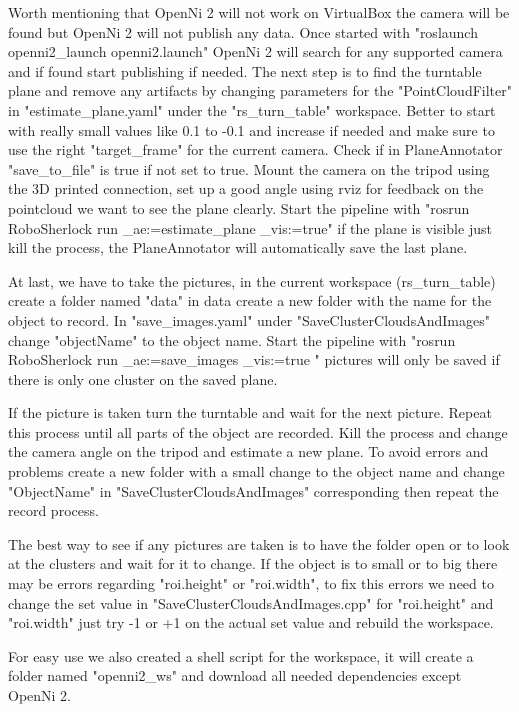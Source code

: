 \documentclass[main.tex]{subfiles}
\begin{document}
		Worth mentioning that OpenNi 2 will not work on VirtualBox the camera will be found but OpenNi 2 will not publish any data.
		Once started with "roslaunch openni2\_launch openni2.launch" OpenNi 2 will search for any supported camera and
		if found start publishing if needed. The next step is to find the turntable plane and remove any artifacts by changing parameters
		for the "PointCloudFilter" in "estimate\_plane.yaml" under the "rs\_turn\_table" workspace.
		Better to start with really small values like 0.1 to -0.1 and increase if needed 
		and make sure to use the right "target\_frame" for the current camera. 
		Check if in PlaneAnnotator "save\_to\_file" is true if not set to true.
		Mount the camera on the tripod using the 3D printed connection,
		set up a good angle using rviz for feedback on the pointcloud we want to see the plane clearly.
		Start the pipeline with "rosrun RoboSherlock run \_ae:=estimate\_plane \_vis:=true"
		if the plane is visible just kill the process, the PlaneAnnotator will automatically save the last plane.

		At last, we have to take the pictures, in the current workspace (rs\_turn\_table) create a folder named "data" 
		in data create a new folder with the name for the object to record.
		In "save\_images.yaml" under "SaveClusterCloudsAndImages" change "objectName" to the object name.
		Start the pipeline with "rosrun RoboSherlock run \_ae:=save\_images \_vis:=true " pictures will only be saved
		if there is only one cluster on the saved plane.

		If the picture is taken turn the turntable and wait for the next picture.
		Repeat this process until all parts of the object are recorded.
		Kill the process and change the camera angle on the tripod and estimate a new plane.
		To avoid errors and problems create a new folder with a small change to the object name
		and change "ObjectName" in "SaveClusterCloudsAndImages" corresponding then repeat the record process.

		The best way to see if any pictures are taken is to have the folder open or to look at the clusters and wait for it to change.
		If the object is to small or to big there may be errors regarding "roi.height" or "roi.width",
		to fix this errors we need to change the set value in "SaveClusterCloudsAndImages.cpp"
		for "roi.height" and "roi.width" just try -1 or +1 on the actual set value and rebuild the workspace.

		For easy use we also created a shell script for the workspace, it will create a folder named "openni2\_ws"
		and download all needed dependencies except OpenNi 2.
\end{document}
